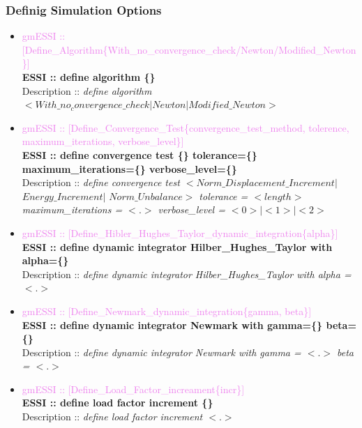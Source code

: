 \documentclass[11pt]{article}
\begin{document}
\subsubsection{Definig Simulation Options}

    \begin{itemize}

      \item \textcolor{violet} {gmESSI :: [Define\_Algorithm\{With\_no\_convergence\_check/Newton/Modified\_Newton\}]}\\
      \textbf{ESSI :: define algorithm \{\}}\\
      Description :: \textit{define algorithm $<With\_no_convergence\_check|Newton|Modified\_Newton>$}

      \item \textcolor{violet} {gmESSI :: [Define\_Convergence\_Test\{convergence\_test\_method, tolerence, maximum\_iterations, verbose\_level\}]}\\
      \textbf{ESSI :: define convergence test \{\} tolerance=\{\} maximum\_iterations=\{\}  verbose\_level=\{\}}\\
      Description :: \textit{define convergence test $<Norm\_Displacement\_Increment|$ $Energy\_Increment|$ $Norm\_Unbalance>$ tolerance = $<length>$ maximum\_iterations = $<.>$ verbose\_level = $<0>|<1>|<2>$}

      \item \textcolor{violet} {gmESSI :: [Define\_Hibler\_Hughes\_Taylor\_dynamic\_integration\{alpha\}]}\\
      \textbf{ESSI :: define dynamic integrator Hilber\_Hughes\_Taylor with alpha=\{\}}\\
      Description :: \textit{define dynamic integrator Hilber\_Hughes\_Taylor with alpha = $<.>$}

      \item \textcolor{violet} {gmESSI :: [Define\_Newmark\_dynamic\_integration\{gamma, beta\}]}\\
      \textbf{ESSI :: define dynamic integrator Newmark with gamma=\{\}  beta=\{\}}\\
      Description :: \textit{define dynamic integrator Newmark with gamma = $<.>$ beta = $<.>$}

      \item \textcolor{violet} {gmESSI :: [Define\_Load\_Factor\_increament\{incr\}]}\\
      \textbf{ESSI :: define load factor increment \{\}}\\
      Description :: \textit{define load factor increment $<.>$}


\end{itemize}
\end{document}
